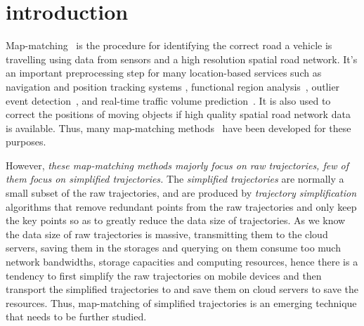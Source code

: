 

\section{introduction}
\label{sec-intro}

Map-matching~\cite{Newson2009Hidden,Wang:eddy,yin:feature-based,Hunter2013,liu:st-crf} is the procedure for identifying the correct road a vehicle is travelling using data from sensors and a high resolution spatial road network\cite{Newson2009Hidden}.
It's an important preprocessing step for many location-based services such as navigation and position tracking systems \cite{Yin:2015:Context, Yin:2015:Exploiting, Gustafsson:2002:Particle, Mohammed:2006:Fuzzy}, functional region analysis~\cite{Yuan:regions}, outlier event detection~\cite{Zhang:2012:Outlier,Chawla:2012:Anomalies}, and real-time traffic volume prediction~\cite{Jenelius:time}.
It is also used to correct the positions of moving objects if high quality spatial road network data is available\cite{Quddus2003}. Thus, many map-matching methods~\cite{Newson2009Hidden,Wang:eddy,yin:feature-based,Hunter2013,liu:st-crf} have been developed for these purposes.

However, \textit{these map-matching methods majorly focus on raw trajectories, few of them focus on {simplified trajectories}.}
The \emph{simplified trajectories} are normally a small subset of the raw trajectories, and are produced by \emph{trajectory simplification} algorithms \cite{Douglas:Peucker,Meratnia:Spatiotemporal,Muckell:SQUISH,Lin:Operb,Zhang:Evaluation,Lin:Cised} that remove
redundant points from the raw trajectories and only keep the key points so as to greatly reduce the data size of trajectories.
As we know the data size of raw trajectories is massive, %
transmitting them to the cloud servers, saving them in the storages and querying on them consume too much network bandwidths, storage capacities and computing resources,
hence there is a tendency to first simplify the raw trajectories on mobile devices and then transport the simplified trajectories to and save them on cloud servers to save the resources.
Thus, map-matching of simplified trajectories is an emerging technique that needs to be further studied.


